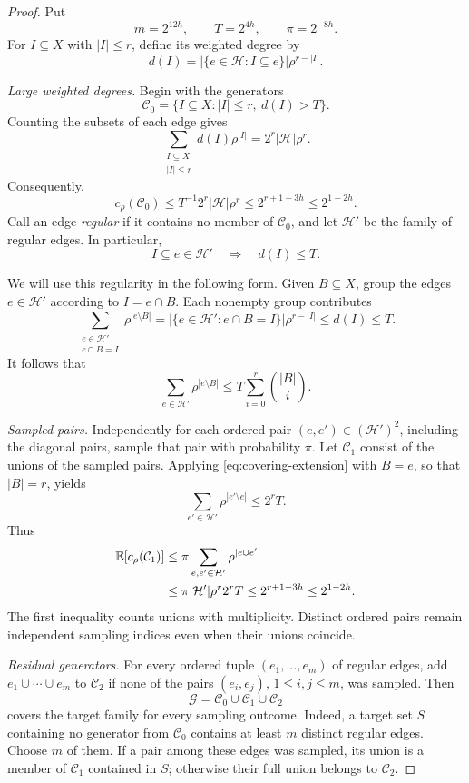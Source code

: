 \documentclass[11pt,letterpaper]{article}
\theoremstyle{definition}
\theoremstyle{remark}
\numberwithin{equation}{section}
\begin{document}
\begin{proof}
Put
\[
m=2^{12h},\qquad T=2^{4h},\qquad \pi=2^{-8h}.
\]
For \(I\subseteq X\) with \(|I|\le r\), define its weighted degree by
\[
d(I)=|\{e\in\mathcal H:I\subseteq e\}|\rho^{r-|I|}.
\]

\emph{Large weighted degrees.}
Begin with the generators
\[
\mathcal C_0=\{I\subseteq X:|I|\le r,\ d(I)>T\}.
\]
Counting the subsets of each edge gives
\[
\sum_{\substack{I\subseteq X\\|I|\le r}}d(I)\rho^{|I|}
=2^r|\mathcal H|\rho^r.
\]
Consequently,
\begin{equation}\label{eq:covering-initial-cost}
c_\rho(\mathcal C_0)
\le T^{-1}2^r|\mathcal H|\rho^r
\le2^{r+1-3h}\le2^{1-2h}.
\end{equation}
Call an edge \emph{regular} if it contains no member of \(\mathcal C_0\),
and let \(\mathcal H'\) be the family of regular edges. In particular,
\[
I\subseteq e\in\mathcal H'
\quad\Longrightarrow\quad d(I)\le T.
\]

We will use this regularity in the following form. Given \(B\subseteq X\),
group the edges \(e\in\mathcal H'\) according to \(I=e\cap B\).
Each nonempty group contributes
\[
\sum_{\substack{e\in\mathcal H'\\e\cap B=I}}
  \rho^{|e\setminus B|}
=|\{e\in\mathcal H':e\cap B=I\}|\rho^{r-|I|}
\le d(I)\le T.
\]
It follows that
\begin{equation}\label{eq:covering-extension}
\sum_{e\in\mathcal H'}\rho^{|e\setminus B|}
\le T\sum_{i=0}^r\binom{|B|}{i}.
\end{equation}

\emph{Sampled pairs.}
Independently for each ordered pair \((e,e')\in(\mathcal H')^2\),
including the diagonal pairs, sample that pair with probability \(\pi\).
Let \(\mathcal C_1\) consist of the unions of the sampled pairs. Applying
\eqref{eq:covering-extension} with \(B=e\), so that \(|B|=r\), yields
\[
\sum_{e'\in\mathcal H'}\rho^{|e'\setminus e|}\le2^rT.
\]
Thus
\begin{align}
\mathbb E[c_\rho(\mathcal C_1)]
&\le\pi\sum_{e,e'\in\mathcal H'}\rho^{|e\cup e'|}
\notag\\
&\le\pi|\mathcal H'|\rho^r2^rT
\le2^{r+1-3h}\le2^{1-2h}.
\label{eq:covering-pair-cost}
\end{align}
The first inequality counts unions with multiplicity. Distinct ordered
pairs remain independent sampling indices even when their unions coincide.

\emph{Residual generators.}
For every ordered tuple \((e_1,\ldots,e_m)\) of regular edges,
add \(e_1\cup\cdots\cup e_m\) to \(\mathcal C_2\) if none of the pairs
\((e_i,e_j)\), \(1\le i,j\le m\), was sampled.
Then
\[
\mathcal G=\mathcal C_0\cup\mathcal C_1\cup\mathcal C_2
\]
covers the target family for every sampling outcome. Indeed, a target set
\(S\) containing no generator from \(\mathcal C_0\) contains at least \(m\)
distinct regular edges. Choose \(m\) of them. If a pair among these edges
was sampled, its union is a member of \(\mathcal C_1\) contained in \(S\);
otherwise their full union belongs to \(\mathcal C_2\).


\end{proof}
\end{document}
